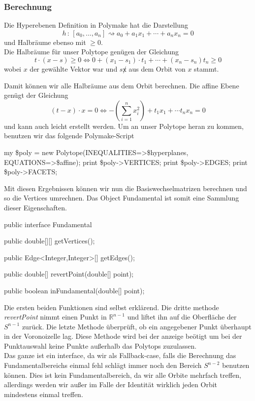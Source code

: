         \subsubsection*{Berechnung}

         Die Hyperebenen Definition in Polymake hat die Darstellung
         $$
            h \, : \, [a_0, ..., a_n] \rightsquigarrow a_0 + a_1 x_1 + \cdots + a_n x_n = 0
         $$
         und Halbräume ebenso mit $\geq 0$.\\

         Die Halbräume für unser Polytope genügen der Gleichung
         $$
            t \cdot (x - s) \geq 0 \Leftrightarrow 0 + (x_1-s_1)\cdot t_1 + \cdots + (x_n -s_n)t_n \geq 0
         $$
         wobei $x$ der gewählte Vektor war und $s \not x$ aus dem Orbit von $x$ stammt.

         Damit können wir alle Halbräume aus dem Orbit berechnen. Die affine Ebene genügt der Gleichung
         $$
            (t - x) \cdot x = 0 \Leftrightarrow - \left( \sum_{i=1}^n x_i^2 \right) + t_1 x_1 + \cdots t_n x_n = 0
         $$
         und kann auch leicht erstellt werden. Um an unser Polytope heran zu kommen, benutzen wir das folgende Polymake-Script

         \begin{code}
            my \$poly = new Polytope(INEQUALITIES=>\$hyperplanes, EQUATIONS=>\$affine);
            print \$poly->VERTICES;
            print \$poly->EDGES;
            print \$poly->FACETS;
         \end{code}

         Mit diesen Ergebnissen können wir nun die Basiswechselmatrizen berechnen und so die Vertices umrechnen. Das Object Fundamental ist somit
         eine Sammlung dieser Eigenschaften.

         \begin{code}
            public interface Fundamental {
               public double[][] getVertices();
               
               public Edge<Integer,Integer>[] getEdges();

               public double[] revertPoint(double[] point);

               public boolean inFundamental(double[] point);
            }
         \end{code}
         
         Die ersten beiden Funktionen sind selbst erklärend. Die dritte methode \emph{revertPoint} nimmt einen Punkt in $\mathbb{R}^{n-1}$ und
         liftet ihn auf die Oberfläche der $S^{n-1}$ zurück. Die letzte Methode überprüft, ob ein angegebener Punkt überhaupt in der Voronoizelle lag.
         Diese Methode wird bei der anzeige beötigt um bei der Punktauswahl keine Punkte außerhalb das Polytops zuzulassen.\\

         Das ganze ist ein interface, da wir als Fallback-case, falls die Berechnung das Fundamentalbereichs einmal fehl schlägt immer noch 
         den Bereich $S^{n-2}$ benutzen können. Dies ist kein Fundamentalbereich, da wir alle Orbite mehrfach treffen, allerdings werden wir außer im Falle
         der Identität wirklich jeden Orbit mindestens einmal treffen.
